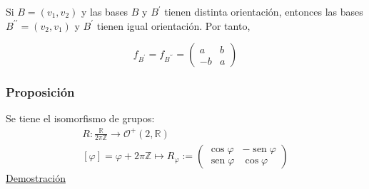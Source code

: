 \documentclass[12pt, a4paper, ones, notitlepage, openany,titlepage]{article}
\begin{document}
Si $B=\left(v_{1}, v_{2}\right)$ y las bases $B$ y $B^{\prime}$ tienen distinta orientación, entonces las bases $B^{\prime \prime}=\left(v_{2}, v_{1}\right)$ y $B^{\prime}$ tienen igual orientación. Por tanto,

$$
f_{B^{\prime}}=f_{B^{\prime \prime}}=\left(\begin{array}{rr}
	a & b \\
	-b & a
\end{array}\right)
$$

\subsubsection{Proposición}
Se tiene el isomorfismo de grupos:
$$
\begin{gathered}
	R: \frac{\mathbb{R}}{2 \pi \mathbb{Z}} \longrightarrow \mathcal{O}^{+}(2, \mathbb{R}) \\
	[\varphi] = \varphi+2 \pi \mathbb{Z} \longmapsto R_{\varphi} := \begin{pmatrix}
		\operatorname{cos}\varphi & -\operatorname{sen}\varphi \\
		\operatorname{sen}\varphi & \operatorname{cos}\varphi
	\end{pmatrix}
\end{gathered}
$$
\noindent\underline{Demostración}
\end{document}
